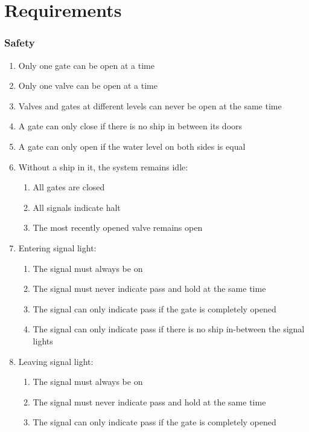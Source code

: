 \section{Requirements}
\subsubsection*{Safety}
\begin{enumerate}
	\item Only one gate can be open at a time
	\item Only one valve can be open at a time
	\item Valves and gates at different levels can never be open at the same time	
	\item A gate can only close if there is no ship in between its doors
	\item A gate can only open if the water level on both sides is equal
	\item Without a ship in it, the system remains idle:
	\begin{enumerate}
		\item All gates are closed
		\item All signals indicate halt
		\item The most recently opened valve remains open
	\end{enumerate}
	\item Entering signal light:
	\begin{enumerate}
		\item The signal must always be on
		\item The signal must never indicate pass and hold at the same time
		\item The signal can only indicate pass if the gate is completely opened
		\item The signal can only indicate pass if there is no ship in-between the signal lights
	\end{enumerate}
	\item Leaving signal light:
	\begin{enumerate}
		\item The signal must always be on
		\item The signal must never indicate pass and hold at the same time
		\item The signal can only indicate pass if the gate is completely opened
	\end{enumerate}
\end{enumerate}
	
